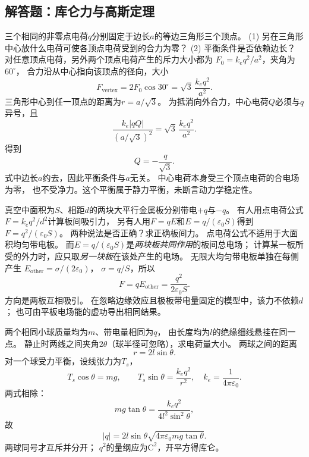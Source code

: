 \subsection{解答题：库仑力与高斯定理}

\problemtext 三个相同的非零点电荷$q$分别固定于边长$a$的等边三角形三个顶点。
(1) 另在三角形中心放什么电荷可使各顶点电荷受到的合力为零？
(2) 平衡条件是否依赖边长？
\workings
对任意顶点电荷，另外两个顶点电荷产生的斥力大小都为
$F_0=k_eq^2/a^2$，夹角为$60^\circ$，
合力沿从中心指向该顶点的径向，大小
\[
F_{\mathrm{vertex}}=2F_0\cos30^\circ
=\sqrt3\,\frac{k_eq^2}{a^2}.
\]
三角形中心到任一顶点的距离为$r=a/\sqrt3$。
为抵消向外合力，中心电荷$Q$必须与$q$异号，且
\[
\frac{k_e|qQ|}{(a/\sqrt3)^2}
=\sqrt3\,\frac{k_eq^2}{a^2}.
\]
得到
\[
\boxed{Q=-\frac{q}{\sqrt3}}.
\]
式中边长$a$约去，因此平衡条件与$a$无关。
\crosscheck 中心电荷本身受三个顶点电荷的合电场为零，
也不受净力。这个平衡属于静力平衡，未断言动力学稳定性。

\problemtext 真空中面积为$S$、相距$d$的两块大平行金属板分别带电$+q$与$-q$。
有人用点电荷公式$F=k_eq^2/d^2$计算板间吸引力，
另有人用$F=qE$和$E=q/(\varepsilon_0 S)$得到$F=q^2/(\varepsilon_0 S)$。
两种说法是否正确？求正确板间力。
\workings
点电荷公式不适用于大面积均匀带电板。
而$E=q/(\varepsilon_0 S)$是\emph{两块板共同作用}的板间总电场；
计算某一板所受的外力时，应只取\emph{另一块板}在该处产生的电场。
无限大均匀带电板单独在每侧产生
$E_{\mathrm{other}}=\sigma/(2\varepsilon_0)$，
$\sigma=q/S$，所以
\[
\boxed{F=qE_{\mathrm{other}}
=\frac{q^2}{2\varepsilon_0 S}}.
\]
方向是两板互相吸引。
\crosscheck 在忽略边缘效应且极板带电量固定的模型中，该力不依赖$d$；
也可由平板电场能的虚功导出相同结果。

\problemtext 两个相同小球质量均为$m$、带电量相同为$q$，
由长度均为$l$的绝缘细线悬挂在同一点。
静止时两线之间夹角$2\theta$（球半径可忽略），求电荷量大小。
\workings
两球之间的距离
\[
r=2l\sin\theta.
\]
对一个球受力平衡，设线张力为$T_s$，
\[
T_s\cos\theta=mg,\qquad
T_s\sin\theta=\frac{k_eq^2}{r^2},
\quad k_e=\frac1{4\pi\varepsilon_0}.
\]
两式相除：
\[
mg\tan\theta=\frac{k_eq^2}{4l^2\sin^2\theta},
\]
故
\[
\boxed{|q|=2l\sin\theta
\sqrt{4\pi\varepsilon_0mg\tan\theta}}.
\]
\crosscheck 两球同号才互斥并分开；
$q^2$的量纲应为$\mathrm{C^2}$，开平方得库仑。

